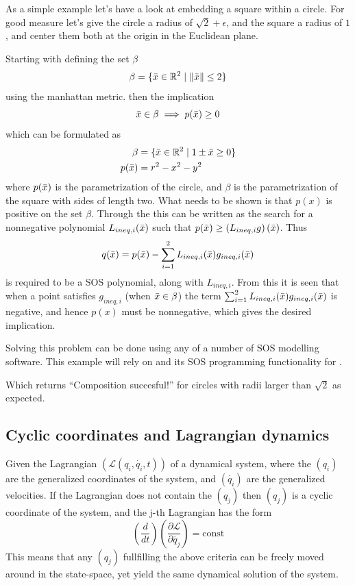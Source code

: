 \begin{example}

  As a simple example let's have a look at embedding a square within a circle.
  For good measure let's give the circle a radius of \(\sqrt{2}+\epsilon\), and
  the square a radius of \(1\), and center them both at the origin in the
  Euclidean plane.

  Starting with defining the set \(\beta\)
  \[
    \beta = \lbrace\bar{x} \in \mathbb{R}^2 \mid \lVert\bar{x}\rVert \leq 2\rbrace
  \]
  using the manhattan metric. then the implication
  \[
    \bar{x} \in \beta \implies p(\bar{x}) \geq 0
  \]
  which can be formulated as
  \begin{align*}
    \beta &= \lbrace\bar{x} \in \mathbb{R}^2 \mid 1 \pm \bar{x} \geq 0 \rbrace \\
    p(\bar{x}) &= r^2 - x^2 - y^2
  \end{align*}
  where \(p(\bar{x})\) is the parametrization of the circle, and \(\beta\) is the
  parametrization of the square with sides of length two. What needs to be shown
  is that \(p(x)\) is positive on the set \(\beta\). Through the
   this can be written as the search for a nonnegative
  polynomial \(L_{ineq,i}(\bar{x})\) such that \(p(\bar{x}) \geq \left( L_{ineq,i}g
  \right)(\bar{x})\). Thus
  \[
    q(\bar{x}) = p(\bar{x}) - \sum_{i=1}^{2}L_{ineq,i}(\bar{x})g_{ineq,i}(\bar{x})
  \]
  is required to be a \ac{SOS} polynomial, along with \(L_{ineq,i}\). From this
  it is seen that when a point satisfies \(g_{ineq,i}\) (\ie when \(\bar{x} \in
  \beta\)) the term \(\sum_{i=1}^{2}L_{ineq,i}(\bar{x})g_{ineq,i}(\bar{x})\) is negative,
  and hence \(p(x)\) must be nonnegative, which gives the desired implication.

  Solving this problem can be done using any of a number of \ac{SOS} modelling
  software. This example will rely on \cite[Yalmip]{Lofberg2004} and its
  \ac{SOS} programming functionality \cite{Lofberg2009} for \matlab.


  

  Which returns ``Composition succesful!'' for circles with radii larger than
  \(\sqrt{2}\) as expected.
\end{example}

\subsection{Cyclic coordinates and Lagrangian dynamics}
\label{subsec:cyclic-coordinates}

Given the Lagrangian \((\mathcal{L}(q_i, \dot{q_i}, t))\) of a dynamical system,
where the \((q_i)\) are the generalized coordinates of the system, and
\((\dot{q_i})\) are the generalized velocities. If the Lagrangian does not
contain the \((q_j)\) then \((q_j)\) is a cyclic coordinate of the system, and
the j-th Lagrangian has the form
\[
  \left( \frac{d}{dt} \right) \left( \frac{\partial \mathcal{L}}{\partial
      \dot{q_j}} \right) = \mathrm{const}
\]
This means that any \((q_j)\) fullfilling the above criteria can be freely moved
around in the state-space, yet yield the same dynamical solution of the system.


